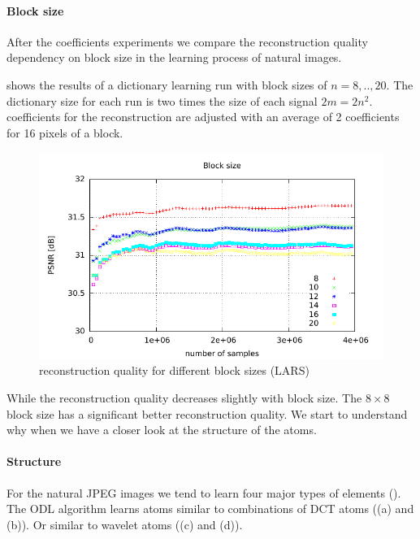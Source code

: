


\paragraph{Block size}
After the coefficients experiments we compare the reconstruction quality
dependency on block size in the learning process of natural images. 

 shows the results of a dictionary
learning run with block sizes of $n=8,..,20$. The dictionary size for each run
is two times the size of each signal $2m=2n^2$. coefficients for the
reconstruction are adjusted with an average of 2 coefficients for 16 pixels of a
block.

\begin{figure}[h]
\centering
\includegraphics[width =
1.0\textwidth]{../tests/results/blockSizeConverg.pdf}
\caption{reconstruction quality for different block sizes (LARS)}
\label{fig:dict size}
\end{figure}

While the reconstruction quality decreases slightly with block size. 
The $8\times8$ block size has a significant better reconstruction quality. 
We start to understand why when we have a closer look at the structure of
the atoms. 

\paragraph{Structure}
For the natural JPEG images we tend to learn four major types of
elements ().
The ODL algorithm learns atoms similar to combinations of DCT atoms
((a) and (b)). Or similar to wavelet atoms ((c) and (d)).

